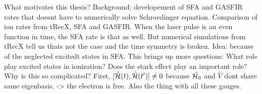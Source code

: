 What motivates this thesis? Background: developement of SFA and GASFIR rates that doesnt have to numerically solve Schroedinger equation.
Comparison of ion rates from tRecX, SFA and GASFIR. When the laser pulse is an even function in time, the SFA rate is that as well. 
But numerical simulations from tRecX tell us thats not the case and the time symmetry is broken. Idea: because of the neglected excitedt states in SFA.
This brings up more questions: What role play excited states in ionization? Does the stark effect play an important role?\\
Why is this so complicated? First, $[\hat{\mathcal{H}}(t), \hat{\mathcal{H}}(t')] \neq 0$ because $\hat{\mathcal{H}_0}$ and $\hat{V}$ dont share same eigenbasis, -> the electron is free. Also the thing with all these gauges.